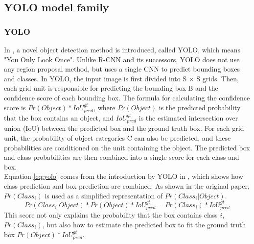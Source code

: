\subsection{YOLO model family}
\subsubsection{YOLO}
In \cite{DBLP:journals/corr/RedmonDGF15}, a novel object detection method is introduced, called YOLO, which means "You Only Look Once". Unlike R-CNN and its successors, YOLO does not use any region proposal method, but uses a single CNN to predict bounding boxes and classes. In YOLO, the input image is first divided into S × S grids. Then, each grid unit is responsible for predicting the bounding box B and the confidence score of each bounding box. The formula for calculating the confidence score is \(Pr(Object)*IoU_{pred}^{gt}\), where \(Pr(Object)\) is the predicted probability that the box contains an object, and \(IoU_{pred}^{gt}\) is the estimated intersection over union (IoU) between the predicted box and the ground truth box. For each grid unit, the probability of object categories C can also be predicted, and these probabilities are conditioned on the unit containing the object. The predicted box and class probabilities are then combined into a single score for each class and box. 
\\Equation \ref{eq:yolo} comes from the introduction by YOLO in \cite{DBLP:journals/corr/RedmonDGF15}, which shows how class prediction and box prediction are combined. As shown in the original paper, \(Pr(Class_i)\) is used as a simplified representation of \(Pr(Class_i|Object)\).
\begin{equation}
	\label{eq:yolo}
	Pr(Class_i|Object)*Pr(Object)*IoU^{gt}_{pred} = Pr(Class_i)*IoU^{gt}_{pred}
\end{equation}
This score not only explains the probability that the box contains class \(i\), \(Pr(Class_i)\), but also how to estimate the predicted box to fit the ground truth box \(Pr(Object)*IoU_{pred}^{gt}\). 
